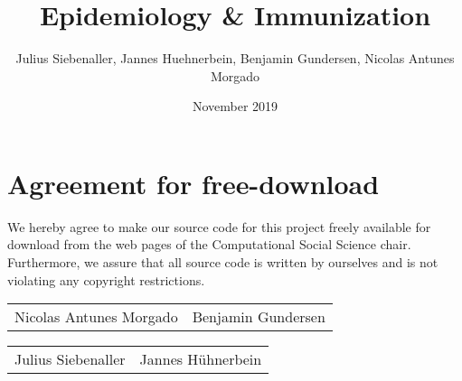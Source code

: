 \documentclass[11pt]{article}
\title{Epidemiology \& Immunization}
\author{Julius Siebenaller, Jannes Huehnerbein, Benjamin Gundersen, Nicolas Antunes Morgado}
\date{November 2019}
\begin{document}


\newpage

\newpage
\section*{Agreement for free-download}
\bigskip
\bigskip

\large We hereby agree to make our source code for this project freely available for download from the web pages of the Computational Social Science chair. Furthermore, we assure that all source code is written by ourselves and is not violating any copyright restrictions.

\begin{center}
\bigskip
\bigskip
\bigskip
\bigskip

\begin{tabular}{@{}p{8cm}@{}@{}p{8cm}@{}}

\begin{minipage}{8cm}
\large Nicolas Antunes Morgado
\end{minipage}

&
\begin{minipage}{8cm}
\large Benjamin Gundersen
\end{minipage}

\end{tabular}


\vspace{3\baselineskip}

\begin{tabular}{@{}p{8cm}@{}@{}p{8cm}@{}}

\begin{minipage}{8cm}
\large Julius Siebenaller
\end{minipage}
&
\begin{minipage}{8cm}
\large Jannes H\"uhnerbein
\end{minipage}
\end{tabular}

\end{center}


\newpage




\end{document}
